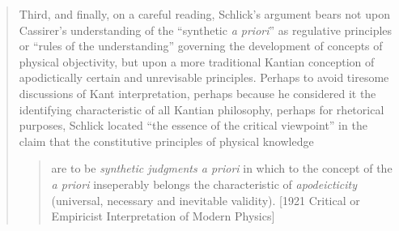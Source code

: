 \begin{quote}
    Third, and finally, on a careful reading, Schlick's argument bears not upon Cassirer's understanding of the ``synthetic \emph{a priori}'' as regulative principles or ``rules of the understanding'' governing the development of concepts of physical objectivity, but upon a more traditional Kantian conception of apodictically certain and unrevisable principles.  Perhaps to avoid tiresome discussions of Kant interpretation, perhaps because he considered it the identifying characteristic of all Kantian philosophy, perhaps for rhetorical purposes, Schlick located ``the essence of the critical viewpoint'' in the claim that the constitutive principles of physical knowledge 
    
    \begin{quote}
        are to be \emph{synthetic judgments a priori} in which to the concept of the \emph{a priori} inseperably belongs the characteristic of \emph{apodeicticity} (universal, necessary and inevitable validity). [1921 Critical or Empiricist Interpretation of Modern Physics]
    \end{quote}
    

\end{quote}
